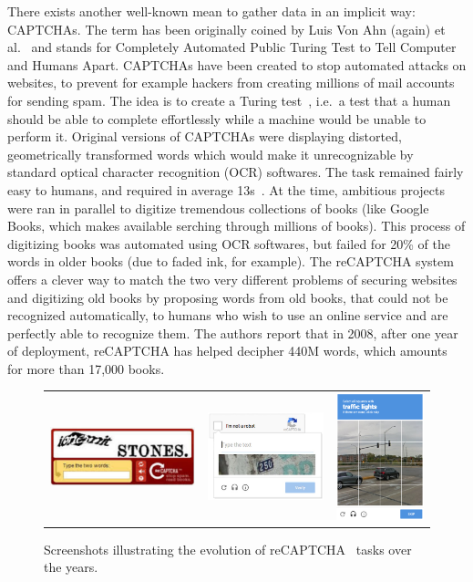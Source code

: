 There exists another well-known mean to gather data in an implicit way: CAPTCHAs.
The term has been originally coined by
Luis Von Ahn (again) et al.~\cite{von2003captcha} and stands for
Completely Automated Public Turing Test to Tell Computer and Humans Apart.
CAPTCHAs have been created to stop automated attacks on websites,
to prevent for example hackers from creating millions of mail accounts for sending spam.
The idea is to create a Turing test~\cite{machinery1950computing},
i.e.\ a test that a human should be able to complete effortlessly
while a machine would be unable to perform it.
Original versions of CAPTCHAs were displaying distorted,
geometrically transformed words which would make it unrecognizable
by standard optical character recognition (OCR) softwares.
The task remained fairly easy to humans,
and required in average 13s~\cite{von2008recaptcha}.
At the time, ambitious projects were ran in parallel to digitize
tremendous collections of books
(like Google Books, which makes available serching through millions of books).
This process of digitizing books was automated using OCR softwares,
but failed for 20\% of the words in older books (due to faded ink, for example).
The reCAPTCHA system offers a clever way to match the two very different
problems of securing websites and digitizing old books by proposing words from old books,
that could not be recognized automatically,
to humans who wish to use an online service and are perfectly able to recognize them.
The authors report that in 2008, after one year of deployment,
reCAPTCHA has helped decipher 440M words, which amounts for more than 17,000 books.

\begin{figure}
	\centering
	\begin{tabular}{ccc}
\includegraphics[width=5cm]{assets/img/recaptcha.png} & \includegraphics[width=4cm]{assets/img/recaptcha-streetview.jpg} &
\includegraphics[width=3cm]{assets/img/reCAPTCHA_v2.png} \\
	\end{tabular}
	\caption{Screenshots illustrating the evolution of reCAPTCHA~\cite{von2008recaptcha} tasks over the years.}%
	\label{fig:recaptcha}
\end{figure}

